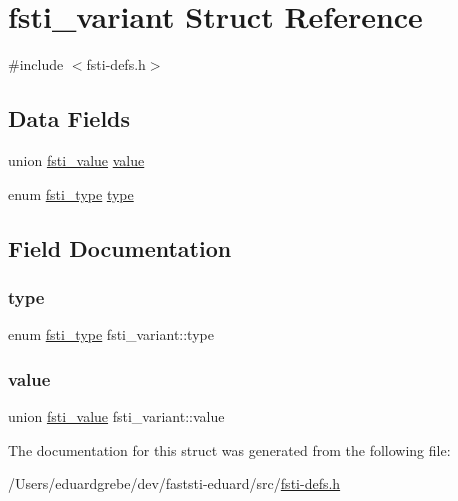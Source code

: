 \hypertarget{structfsti__variant}{}\section{fsti\+\_\+variant Struct Reference}
\label{structfsti__variant}


{\ttfamily \#include $<$fsti-\/defs.\+h$>$}

\subsection*{Data Fields}
\begin{DoxyCompactItemize}
\item 
union \mbox{\hyperlink{unionfsti__value}{fsti\+\_\+value}} \mbox{\hyperlink{structfsti__variant_a0cc10d0720f34ac052f489c080762b30}{value}}
\item 
enum \mbox{\hyperlink{fsti-defs_8h_ab12bd8dfbafbc55e2015aac7926007cf}{fsti\+\_\+type}} \mbox{\hyperlink{structfsti__variant_a9354fcc6fb77572e22ed830cdd4c99e2}{type}}
\end{DoxyCompactItemize}


\subsection{Field Documentation}
\mbox{\label{structfsti__variant_a9354fcc6fb77572e22ed830cdd4c99e2}} 
\subsubsection{\texorpdfstring{type}{type}}
{\footnotesize\ttfamily enum \mbox{\hyperlink{fsti-defs_8h_ab12bd8dfbafbc55e2015aac7926007cf}{fsti\+\_\+type}} fsti\+\_\+variant\+::type}

\mbox{\label{structfsti__variant_a0cc10d0720f34ac052f489c080762b30}} 
\subsubsection{\texorpdfstring{value}{value}}
{\footnotesize\ttfamily union \mbox{\hyperlink{unionfsti__value}{fsti\+\_\+value}} fsti\+\_\+variant\+::value}



The documentation for this struct was generated from the following file\+:\begin{DoxyCompactItemize}
\item 
/\+Users/eduardgrebe/dev/faststi-\/eduard/src/\mbox{\hyperlink{fsti-defs_8h}{fsti-\/defs.\+h}}\end{DoxyCompactItemize}
